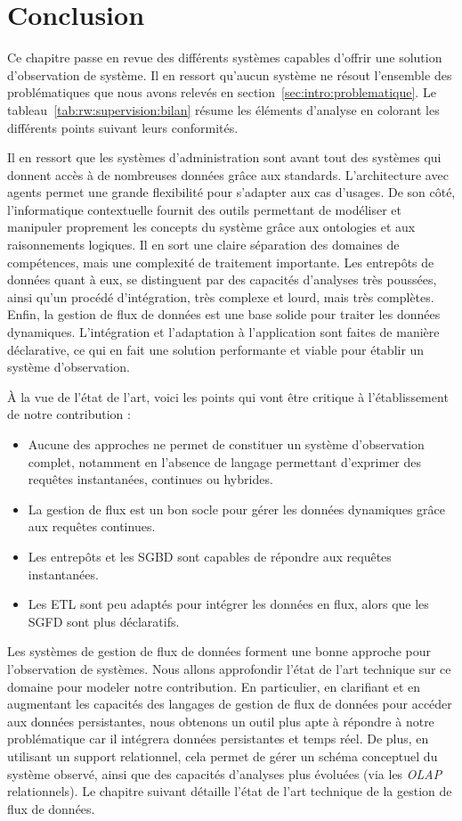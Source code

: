 \section{Conclusion}
Ce chapitre passe en revue des différents systèmes capables d'offrir une solution d'observation de système. Il en ressort qu'aucun système ne résout l'ensemble des problématiques que nous avons relevés en section~\ref{sec:intro:problematique}. Le tableau~\ref{tab:rw:supervision:bilan} résume les éléments d'analyse en colorant les différents points suivant leurs conformités. 

Il en ressort que les systèmes d'administration sont avant tout des systèmes qui donnent accès à de nombreuses données grâce aux standards. L'architecture avec agents permet une grande flexibilité pour s'adapter aux cas d'usages. De son côté, l'informatique contextuelle fournit des outils permettant de modéliser et manipuler proprement les concepts du système grâce aux ontologies et aux raisonnements logiques. Il en sort une claire séparation des domaines de compétences, mais une complexité de traitement importante. Les entrepôts de données quant à eux, se distinguent par des capacités d'analyses très poussées, ainsi qu'un procédé d'intégration, très complexe et lourd, mais très complètes. Enfin, la gestion de flux de données est une base solide pour traiter les données dynamiques. L'intégration et l'adaptation à l'application sont faites de manière déclarative, ce qui en fait une solution performante et viable pour établir un système d'observation.

À la vue de l'état de l'art, voici les points qui vont être critique à l'établissement de notre contribution :
\begin{itemize}
    \item Aucune des approches ne permet de constituer un système d'observation complet, notamment en l'absence de langage permettant d'exprimer des requêtes instantanées, continues ou hybrides.
    \item La gestion de flux est un bon socle pour gérer les données dynamiques grâce aux requêtes continues.
    \item Les entrepôts et les SGBD sont capables de répondre aux requêtes instantanées.
    \item Les ETL sont peu adaptés pour intégrer les données en flux, alors que les SGFD sont plus déclaratifs.
\end{itemize}

Les systèmes de gestion de flux de données forment une bonne approche pour l'observation de systèmes. Nous allons approfondir l'état de l'art technique sur ce domaine pour modeler notre contribution. En particulier, en clarifiant et en augmentant les capacités des langages de gestion de flux de données pour accéder aux données persistantes, nous obtenons un outil plus apte à répondre à notre problématique car il intégrera données persistantes et temps réel. De plus, en utilisant un support relationnel, cela permet de gérer un schéma conceptuel du système observé, ainsi que des capacités d'analyses plus évoluées (via les \textit{OLAP} relationnels). Le chapitre suivant détaille l'état de l'art technique de la gestion de flux de données.

